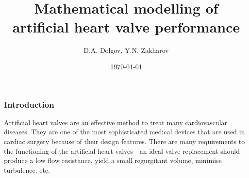 \documentclass[14pt]{beamer}
\title[Modeling of heart valve]{Mathematical modelling of artificial heart valve performance}
\date{\today}
\author[D.A. Dolgov]{D.A. Dolgov, Y.N. Zakharov}
\institute{
    Kemerovo State University\\
    \vspace{0.7cm}
    \vspace{0.7cm}
}
\begin{document}
\begin{otherlanguage}{english}
\maketitle
\end{otherlanguage}

\begin{frame}
\frametitle{Introduction}
Artificial heart valves are an effective method to treat many cardiovascular
diseases. They are one of the most sophisticated medical devices that are used
in cardiac surgery because of their design features. There are many
requirements to the functioning of the artificial heart valves - an ideal valve
replacement should produce a low flow resistance, yield a small regurgitant
volume, minimise turbulence, etc.
\end{frame}
\end{document}
